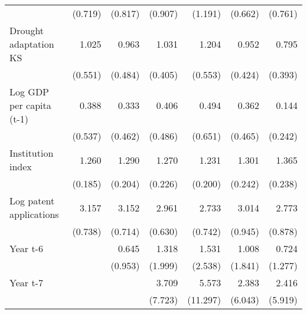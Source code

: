 \begin{table}[htbp]
\begin{tabular}{l*{6}{D{.}{.}{-1}}}
                    &     (0.719)         &     (0.817)         &     (0.907)         &     (1.191)         &     (0.662)         &     (0.761)         \\
\addlinespace
Drought adaptation KS&       1.025         &       0.963         &       1.031         &       1.204         &       0.952         &       0.795         \\
                    &     (0.551)         &     (0.484)         &     (0.405)         &     (0.553)         &     (0.424)         &     (0.393)         \\
\addlinespace
Log GDP per capita (t-1)&       0.388         &       0.333         &       0.406         &       0.494         &       0.362         &       0.144         \\
                    &     (0.537)         &     (0.462)         &     (0.486)         &     (0.651)         &     (0.465)         &     (0.242)         \\
\addlinespace
Institution index   &       1.260\sym{\%}  &       1.290\sym{\%}  &       1.270         &       1.231         &       1.301         &       1.365\sym{*}  \\
                    &     (0.185)         &     (0.204)         &     (0.226)         &     (0.200)         &     (0.242)         &     (0.238)         \\
\addlinespace
Log patent applications&       3.157\sym{***}&       3.152\sym{***}&       2.961\sym{***}&       2.733\sym{***}&       3.014\sym{***}&       2.773\sym{***}\\
                    &     (0.738)         &     (0.714)         &     (0.630)         &     (0.742)         &     (0.945)         &     (0.878)         \\
\addlinespace
Year t-6            &                     &       0.645         &       1.318         &       1.531         &       1.008         &       0.724         \\
                    &                     &     (0.953)         &     (1.999)         &     (2.538)         &     (1.841)         &     (1.277)         \\
\addlinespace
Year t-7            &                     &                     &       3.709         &       5.573         &       2.383         &       2.416         \\
                    &                     &                     &     (7.723)         &    (11.297)         &     (6.043)         &     (5.919)         \\

\end{tabular}
\end{table}

